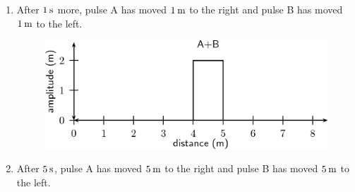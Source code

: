 {\begin{mdframed}[linewidth=4, leftmargin=40, rightmargin=40]
\begin{exercise}
\begin{enumerate}[noitemsep, label=\textbf{Step} \textbf{\arabic*}. ]
      \par 
      \item  
      \label{m38802*id316332}After \begin{math}1\phantom{\rule{2pt}{0ex}}\mathrm{s}\end{math} more, pulse A has moved \begin{math}1\phantom{\rule{2pt}{0ex}}\mathrm{m}\end{math} to the right and pulse B has moved \begin{math}1\phantom{\rule{2pt}{0ex}}\mathrm{m}\end{math} to the left.\par 
      \label{m38802*id316337}
        
    \setcounter{subfigure}{0}


	\begin{figure}[H] %
    \begin{center}
    \label{m38802*id316340!!!underscore!!!media}\label{m38802*id316340!!!underscore!!!printimage}\includegraphics{col11305.imgs/m38802_PG10C4_022.png} %
        
      \vspace{2pt}
    \vspace{.1in}
    
    \end{center}

 \end{figure}   

    \addtocounter{footnote}{-0}
    
      \par 
      \item  
      \label{m38802*id316351}After \begin{math}5\phantom{\rule{2pt}{0ex}}\mathrm{s}\end{math}, pulse A has moved \begin{math}5\phantom{\rule{2pt}{0ex}}\mathrm{m}\end{math} to the right and pulse B has moved \begin{math}5\phantom{\rule{2pt}{0ex}}\mathrm{m}\end{math} to the left.\par 
      \label{m38802*id316356}
        

\end{enumerate}
\end{exercise}
\end{mdframed}}
